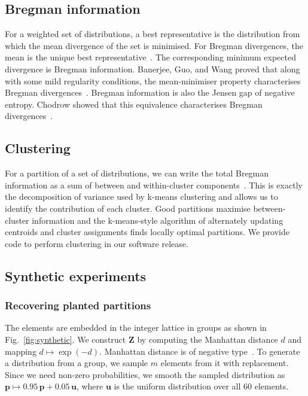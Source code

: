 \documentclass[aps,pre,floats,floatfix,superscriptaddress,twocolumn,final,10pt]{revtex4-2}
\theoremstyle{definition}
\renewcommand{\vec}[1]{\mathbf{#1}}
\begin{document}
\subsection{Bregman information}

For a weighted set of distributions, a best representative is the distribution from which the mean divergence of the set is minimised. For Bregman divergences, the mean is the unique best representative~\cite{Banerjee2004}. The corresponding minimum expected divergence is Bregman information. Banerjee, Guo, and Wang proved that along with some mild regularity conditions, the mean-minimiser property characterises Bregman divergences~\cite[Theorem 4]{Banerjee2005}. Bregman information is also the Jensen gap of negative entropy. Chodrow showed that this equivalence characterises Bregman divergences~\cite[Theorem 1]{Chodrow2025}.

\subsection{Clustering}
For a partition of a set of distributions, we can write the total Bregman information as a sum of between and within-cluster components~\cite{Banerjee2004}. This is exactly the decomposition of variance used by k-means clustering and allows us to identify the contribution of each cluster. Good partitions maximise between-cluster information and the k-means-style algorithm of alternately updating centroids and cluster assignments finds locally optimal partitions. We provide code to perform clustering in our software release.

\subsection{Synthetic experiments}

\subsubsection{Recovering planted partitions}

The elements are embedded in the integer lattice in groups as shown in Fig.~\ref{fig:synthetic}. We construct $\vec{Z}$ by computing the Manhattan distance $d$ and mapping $d \mapsto \exp(-d)$. Manhattan distance is of negative type~\cite{Meckes2013}. To generate a distribution from a group, we sample $m$ elements from it with replacement. Since we need non-zero probabilities, we smooth the sampled distribution as $\vec{p} \mapsto 0.95 \,\vec{p} + 0.05\,\vec{u}$, where $\vec{u}$ is the uniform distribution over all 60 elements. 
\end{document}
